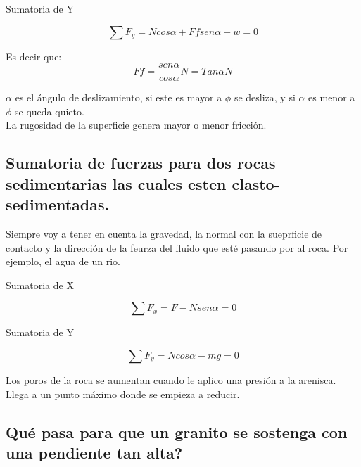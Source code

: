 \documentclass[12pt]{article}
\begin{document}
\begin{large}
 \textup{Sumatoria de Y}
\end{large}
\begin{equation}
 \sum F_{y} = Ncos\alpha + Ffsen\alpha - w = 0
\end{equation}

Es decir que:\\
\begin{equation}
 Ff = \dfrac{sen\alpha}{cos\alpha} N = Tan\alpha N
\end{equation}

$\alpha$ es el \'angulo de deslizamiento, si este es mayor a $\phi$ se desliza, y si $\alpha$ es menor a $\phi$  se queda quieto. \\
\textrightarrow La rugosidad de la superficie genera mayor o menor fricci\'on.\\

\begin{large}
 \subsection{ Sumatoria de fuerzas para dos rocas sedimentarias las cuales esten clasto-sedimentadas. }
\end{large}

Siempre voy a tener en cuenta la gravedad, la normal con la sueprficie de contacto y la dirección de la feurza del fluido que est\'e pasando por al roca. Por ejemplo, el agua de un rio. \\

\begin{large}
 \textup{Sumatoria de X}
\end{large}
\begin{equation}
 \sum F_{x} = F - Nsen\alpha = 0
\end{equation}


\begin{large}
 \textup{Sumatoria de Y}
\end{large}
\begin{equation}
  \sum F_{y} = Ncos\alpha - mg = 0
\end{equation}


Los poros de la roca se aumentan cuando le aplico una presi\'on a la arenisca. Llega a un punto m\'aximo donde se empieza a reducir. \\

\begin{large}
 \subsection{ Qu\'e pasa para que un granito se sostenga con una pendiente tan alta? }
\end{large}
 
\end{document}
